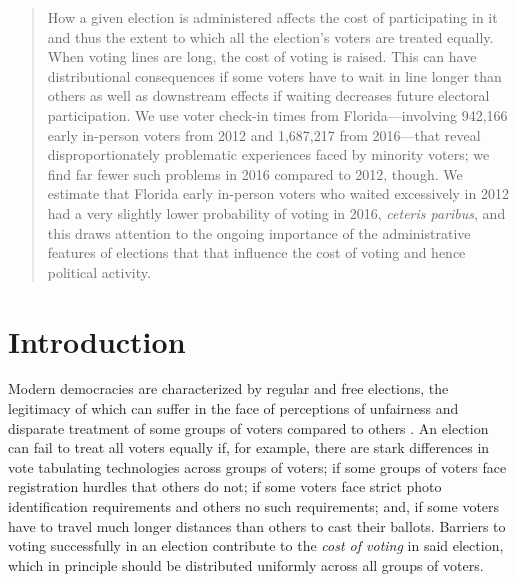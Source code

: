 \documentclass[12pt,titlepage]{article}
\begin{document}
\begin{abstract}
  \noindent 
  How a given election is administered affects the cost of
  participating in it and thus the extent to which all the election's
  voters are treated equally.  When voting lines are long, the cost of
  voting is raised.  This can have distributional consequences if some
  voters have to wait in line longer than others as well as downstream
  effects if waiting decreases future electoral participation.  We use
  voter check-in times from Florida---involving 942,166 early
  in-person voters from 2012 and 1,687,217 from 2016---that reveal
  disproportionately problematic experiences faced by minority voters;
  we find far fewer such problems in 2016 compared to 2012, though.
  We estimate that Florida early in-person voters who waited
  excessively in 2012 had a very slightly lower probability of voting
  in 2016, \emph{ceteris paribus}, and this draws attention to the
  ongoing importance of the administrative features of elections that
  that influence the cost of voting and hence political activity.

\end{abstract}



\newpage
\section*{Introduction}

Modern democracies are characterized by regular and free elections,
the legitimacy of which can suffer in the face of perceptions of
unfairness and disparate treatment of some groups of voters compared
to others \citep{norris2014electoral}.  An election can fail to treat
all voters equally if, for example, there are stark differences in
vote tabulating technologies across groups of voters; if some groups
of voters face registration hurdles that others do not; if some voters
face strict photo identification requirements and others no such
requirements; and, if some voters have to travel much longer distances
than others to cast their ballots.  Barriers to voting successfully in
an election contribute to the \emph{cost of voting} in said election,
which in principle should be distributed uniformly across all groups
of voters.



\end{document}
